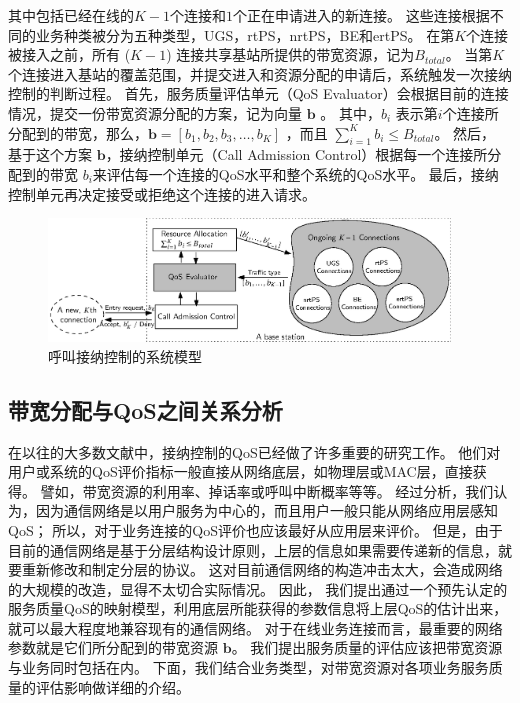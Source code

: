 其中包括已经在线的$K-1$个连接和$1$个正在申请进入的新连接。
这些连接根据不同的业务种类被分为五种类型，UGS，rtPS，nrtPS，BE和ertPS。
在第$K$个连接被接入之前，所有 ($K-1$) 连接共享基站所提供的带宽资源，记为$B_{total}$。
当第$K$个连接进入基站的覆盖范围，并提交进入和资源分配的申请后，系统触发一次接纳控制的判断过程。
首先，服务质量评估单元（QoS Evaluator）会根据目前的连接情况，提交一份带宽资源分配的方案，记为向量 $\mathbf{b}$ 。
其中，$b_i$ 表示第$i$个连接所分配到的带宽，那么，$\mathbf{b} = [ b_1, b_2, b_3, \dots, b_K]$ ，而且 $\sum_{i=1}^K b_i \le B_{total}$。
然后，
基于这个方案 $\mathbf{b}$，接纳控制单元（Call Admission Control）根据每一个连接所分配到的带宽 $b_i$来评估每一个连接的QoS水平和整个系统的QoS水平。
最后，接纳控制单元再决定接受或拒绝这个连接的进入请求。
\begin{figure}[t]
\centering
\includegraphics[width=0.95\textwidth]{cacop_qos_model_system.eps}
\caption{ 呼叫接纳控制的系统模型} \label{fig_system_model_cac}
\end{figure}
\subsection{带宽分配与QoS之间关系分析}
在以往的大多数文献中，接纳控制的QoS已经做了许多重要的研究工作。
他们对用户或系统的QoS评价指标一般直接从网络底层，如物理层或MAC层，直接获得。
譬如，带宽资源的利用率、掉话率或呼叫中断概率等等。
经过分析，我们认为，因为通信网络是以用户服务为中心的，而且用户一般只能从网络应用层感知QoS；
所以，对于业务连接的QoS评价也应该最好从应用层来评价。
但是，由于目前的通信网络是基于分层结构设计原则，上层的信息如果需要传递新的信息，就要重新修改和制定分层的协议。
这对目前通信网络的构造冲击太大，会造成网络的大规模的改造，显得不太切合实际情况。
因此，
我们提出通过一个预先认定的服务质量QoS的映射模型，利用底层所能获得的参数信息将上层QoS的估计出来，
就可以最大程度地兼容现有的通信网络。
对于在线业务连接而言，最重要的网络参数就是它们所分配到的带宽资源 $\mathbf{b}$。
我们提出服务质量的评估应该把带宽资源与业务同时包括在内。
下面，我们结合业务类型，对带宽资源对各项业务服务质量的评估影响做详细的介绍。

